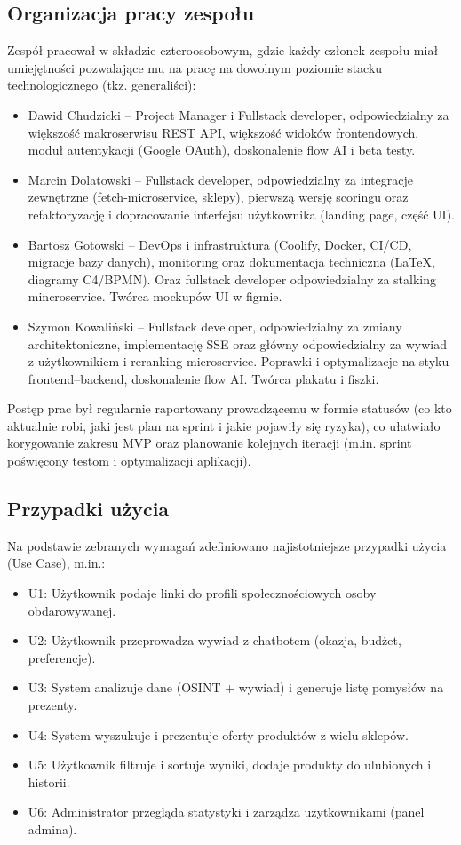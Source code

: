 \documentclass[12pt,a4paper]{article}
\begin{document}
\subsection{Organizacja pracy zespołu}
Zespół pracował w składzie czteroosobowym, gdzie każdy członek zespołu miał umiejętności pozwalające mu na pracę na dowolnym poziomie stacku technologicznego (tkz. generaliści):
\begin{itemize}
    \item Dawid Chudzicki – Project Manager i Fullstack developer, odpowiedzialny za większość makroserwisu REST API, większość widoków frontendowych, moduł autentykacji (Google OAuth), doskonalenie flow AI i beta testy.
    \item Marcin Dolatowski – Fullstack developer, odpowiedzialny za integracje zewnętrzne (fetch-microservice, sklepy), pierwszą wersję scoringu oraz refaktoryzację i dopracowanie interfejsu użytkownika (landing page, część UI).
    \item Bartosz Gotowski – DevOps i infrastruktura (Coolify, Docker, CI/CD, migracje bazy danych), monitoring oraz dokumentacja techniczna (LaTeX, diagramy C4/BPMN). Oraz fullstack developer odpowiedzialny za stalking mincroservice. Twórca mockupów UI w figmie.
    \item Szymon Kowaliński – Fullstack developer, odpowiedzialny za zmiany architektoniczne, implementację SSE oraz główny odpowiedzialny za wywiad z użytkownikiem i reranking microservice. Poprawki i optymalizacje na styku frontend–backend, doskonalenie flow AI. Twórca plakatu i fiszki.
\end{itemize}
Postęp prac był regularnie raportowany prowadzącemu w formie statusów (co kto aktualnie robi, jaki jest plan na sprint i jakie pojawiły się ryzyka), co ułatwiało korygowanie zakresu MVP oraz planowanie kolejnych iteracji (m.in. sprint poświęcony testom i optymalizacji aplikacji).

\subsection{Przypadki użycia}
Na podstawie zebranych wymagań zdefiniowano najistotniejsze przypadki użycia (Use Case), m.in.:
\begin{itemize}
    \item U1: Użytkownik podaje linki do profili społecznościowych osoby obdarowywanej.
    \item U2: Użytkownik przeprowadza wywiad z chatbotem (okazja, budżet, preferencje).
    \item U3: System analizuje dane (OSINT + wywiad) i generuje listę pomysłów na prezenty.
    \item U4: System wyszukuje i prezentuje oferty produktów z wielu sklepów.
    \item U5: Użytkownik filtruje i sortuje wyniki, dodaje produkty do ulubionych i historii.
    \item U6: Administrator przegląda statystyki i zarządza użytkownikami (panel admina).
\end{itemize}
\end{document}

